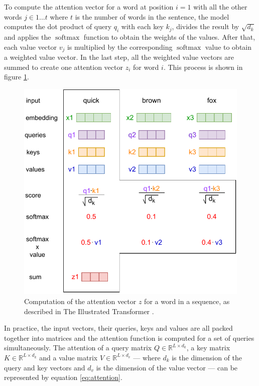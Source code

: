 To compute the attention vector for a word at position $i=1$ with all the other words $j\in1...t$ where $t$ is the number of words in the sentence, the model computes the dot product of query $q_i$ with each key $k_j$, divides the result by $\sqrt{d_k}$ and applies the $\operatorname{softmax}$ function to obtain the weights of the values. After that, each value vector $v_j$ is multiplied by the corresponding $\operatorname{softmax}$ value to obtain a weighted value vector. In the last step, all the weighted value vectors are summed to create one attention vector $z_i$ for word $i$. This process is shown in figure \ref{fig:attention2}.

\begin{figure}[H]
    \centering
    \includegraphics[scale=0.8]{obrazky-figures/attention2.pdf}
    \caption{Computation of the attention vector $z$ for a word in a sequence, as described in The Illustrated Transformer \cite{illustrated-transformer}.}
    \label{fig:attention2}
\end{figure}


In practice, the input vectors, their queries, keys and values are all packed together into matrices and the attention function is computed for a set of queries simultaneously. The attention of a query matrix $Q \in \mathbb{R}^{L \times d_k}$, a key matrix $K \in \mathbb{R}^{L \times d_k}$ and a value matrix $V \in \mathbb{R}^{L \times d_v}$ --- where $d_k$ is the dimension of the query and key vectors and $d_v$ is the dimension of the value vector --- can be represented by equation \ref{eq:attention}.

